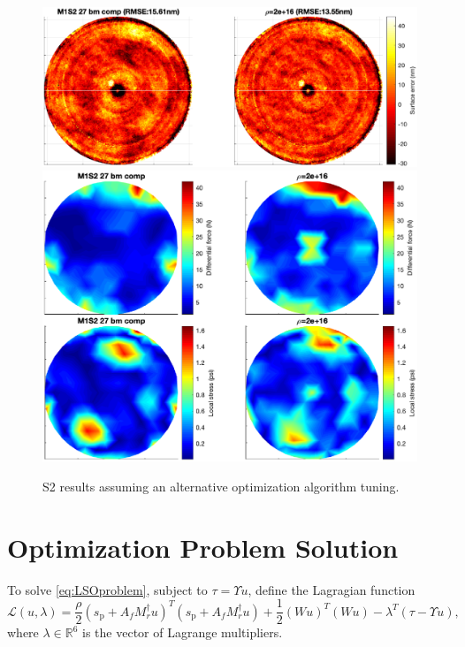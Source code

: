 \documentclass{gmto}
\begin{document}
\begin{figure}[!p]
\centering
\includegraphics[width=\textwidth]{./pictures/s2_surfaceRMSE_rho2e16.eps}
\vfill
\includegraphics[width=\textwidth]{./pictures/s2_NG_sigma_rho2e16.eps}
\caption{\textsf{S2} results assuming an alternative optimization algorithm tuning.}
\label{fig:s2_altrho_results}
\end{figure}



\clearpage \newpage
\section{Optimization Problem Solution}
\label{sec:OPT_sol}

To solve \eqref{eq:LSOproblem}, subject to $\tau = \Upsilon u$, define the Lagragian function
\[
\mathcal{L}(u,\lambda) = \frac{\rho}{2}\left( s_{\text{p}} + A_f M_r^\dagger u \right)^T\left( s_{\text{p}} + A_f M_r^\dagger u \right) + \frac{1}{2} \left(Wu\right)^T\left(Wu\right) - \lambda^T \left(\tau - \Upsilon u\right) ,
\]
where $\lambda \in \mathbb{R}^6$ is the vector of Lagrange multipliers.%
\end{document}
